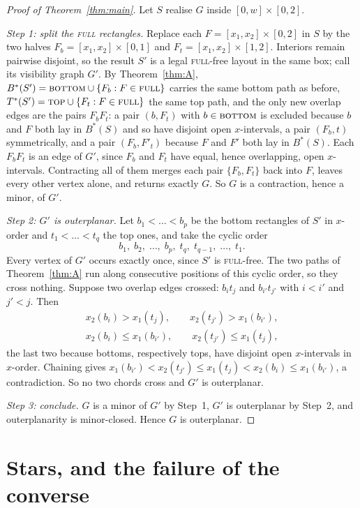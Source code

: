\documentclass[11pt]{amsart}
\theoremstyle{remark}
\newcommand{\Bs}{B^{*}}
\newcommand{\Ts}{T^{*}}
\begin{document}
\begin{proof}[Proof of Theorem~\ref{thm:main}]
Let $S$ realise $G$ inside $[0,w]\times[0,2]$.

\emph{Step 1: split the \textsc{full} rectangles.} Replace each
$F=[x_1,x_2]\times[0,2]$ in $S$ by the two halves $F_b=[x_1,x_2]\times[0,1]$ and
$F_t=[x_1,x_2]\times[1,2]$. Interiors remain pairwise disjoint, so the result $S'$ is a
legal \textsc{full}-free layout in the same box; call its visibility graph $G'$. By
Theorem~\ref{thm:A}, $\Bs(S')=\textsc{bottom}\cup\{F_b:F\in\textsc{full}\}$ carries the
same bottom path as before, $\Ts(S')=\textsc{top}\cup\{F_t:F\in\textsc{full}\}$ the same
top path, and the only new
overlap edges are the pairs $F_bF_t$: a pair $(b,F_t)$ with $b\in\textsc{bottom}$ is
excluded because $b$ and $F$ both lay in $\Bs(S)$ and so have disjoint open
$x$-intervals, a pair $(F_b,t)$ symmetrically, and a pair $(F_b,F'_t)$ because $F$ and
$F'$ both lay in $\Bs(S)$. Each $F_bF_t$ is an edge of $G'$, since $F_b$ and $F_t$ have
equal, hence overlapping, open $x$-intervals. Contracting all of them merges each pair
$\{F_b,F_t\}$ back into $F$, leaves every other vertex alone, and returns exactly $G$.
So $G$ is a contraction, hence a minor, of $G'$.

\emph{Step 2: $G'$ is outerplanar.} Let $b_1<\dots<b_p$ be the bottom rectangles of
$S'$ in $x$-order and $t_1<\dots<t_q$ the top ones, and take the cyclic order
\[
 b_1,\;b_2,\;\dots,\;b_p,\;t_q,\;t_{q-1},\;\dots,\;t_1 .
\]
Every vertex of $G'$ occurs exactly once, since $S'$ is \textsc{full}-free. The two
paths of Theorem~\ref{thm:A} run along consecutive positions of this cyclic order, so
they cross nothing. Suppose two overlap edges crossed: $b_it_j$ and $b_{i'}t_{j'}$ with
$i<i'$ and $j'<j$. Then
\[
\begin{gathered}
 x_2(b_i)>x_1(t_j),\qquad x_2(t_{j'})>x_1(b_{i'}),\\
 x_2(b_i)\le x_1(b_{i'}),\qquad x_2(t_{j'})\le x_1(t_j),
\end{gathered}
\]
the last two because bottoms, respectively tops, have disjoint open $x$-intervals in
$x$-order. Chaining gives $x_1(b_{i'})<x_2(t_{j'})\le x_1(t_j)<x_2(b_i)\le x_1(b_{i'})$,
a contradiction. So no two chords cross and $G'$ is outerplanar.

\emph{Step 3: conclude.} $G$ is a minor of $G'$ by Step~1, $G'$ is outerplanar by
Step~2, and outerplanarity is minor-closed. Hence $G$ is outerplanar.
\end{proof}

\section{Stars, and the failure of the converse}
\end{document}
